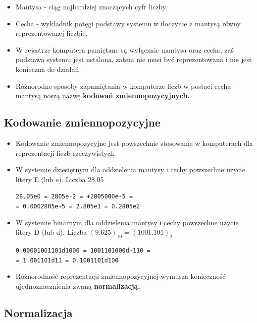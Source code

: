 \documentclass[12pt]{article}
\begin{document}
    \begin{itemize}
        \item Mantysa - ciąg najbardziej znaczących cyfr liczby.
        \item Cecha - wykładnik potęgi podstawy systemu w iloczynie z mantysą równy reprezentowanej liczbie.
        \item W rejestrze komputera pamiętane są wyłącznie mantysa oraz cecha, zaś podstawa systemu jest ustalona, zatem nie musi być reprezentowana i nie jest konieczna do działań.
        \item Różnorodne sposoby zapamiętania w komputerze liczb w postaci cecha-mantysą noszą nazwę \textbf{kodowań zmiennopozycyjnych.}
        
    \end{itemize}
    
    \subsection{Kodowanie zmiennopozycyjne}
    \begin{itemize}
        \item Kodowanie zmiennopozycyjne jest powszechnie stosowanie w komputerach dla reprezentacji liczb rzeczywistych.
        \item W systemie dziesiętnym dla oddzielenia mantysy i cechy powszechne użycie litery E (lub e).
        Liczba 28.05
        \begin{center}
            \texttt{28.05e0 = 2805e-2 = +2805000e-5 =\\
            = 0.0002805e+5 = 2.805e1 = 0.2805e2}
        \end{center}
        
        \item W systemie binarnym dla oddzielenia mantysy i cechy powszechne użycie litery D (lub d).
        Liczba $(9.625)_{10} = (1001.101)_2$
        \begin{center}
            \texttt{0.00001001101d1000 = 1001101000d-110 =\\
            = 1.001101d11 = 0.1001101d100}
        \end{center}
       
       \item Różnorodność reprezentacji zmiennopozycyjnej wymusza konieczność ujednoznacznienia zwaną \textbf{normalizacją.}
       
    \end{itemize}
    
    \subsection{Normalizacja}
    
\end{document}
